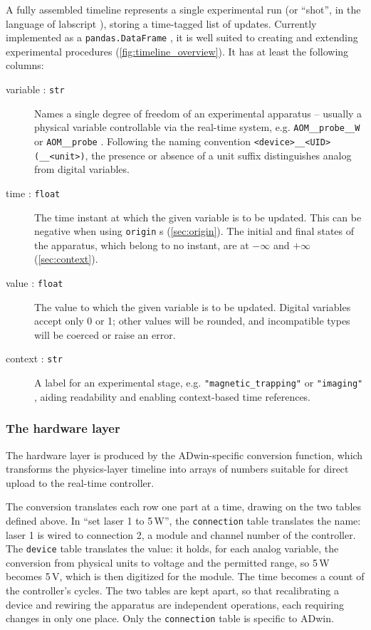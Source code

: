 \documentclass{SciPost}
\newcommand{\python}[1]{%
  \texttt{#1}%
}
\begin{document}
A fully assembled timeline represents a single experimental run (or “shot”, in the language of labscript \cite{starkey2013labscript}), storing a time-tagged list of updates. Currently implemented as a \python{pandas.DataFrame}, it is well suited to creating and extending experimental procedures (\cref{fig:timeline_overview}). It has at least the following columns:
\begin{description}
\item[variable : \python{str}] Names a single degree of freedom of an experimental apparatus – usually a physical variable controllable via the real-time system, e.g. \python{AOM__probe__W} or \python{AOM__probe}. Following the naming convention \texttt{<device>\_\_<UID>(\_\_<unit>)}, the presence or absence of a unit suffix distinguishes analog from digital variables.
\item[time : \python{float}] The time instant at which the given variable is to be updated. This can be negative when using \python{origin}s (\cref{sec:origin}). The initial and final states of the apparatus, which belong to no instant, are at $-\infty$ and $+\infty$ (\cref{sec:context}).
\item[value : \python{float}] The value to which the given variable is to be updated. Digital variables accept only 0 or 1; other values will be rounded, and incompatible types will be coerced or raise an error.
\item[context : \python{str}] A label for an experimental stage, e.g. \python{"magnetic_trapping"} or \python{"imaging"}, aiding readability and enabling context-based time references.
\end{description}
 
\subsubsection{The hardware layer}
\label{sec:hardwarelayer}
The hardware layer is produced by the ADwin-specific conversion function, which transforms the physics-layer timeline into arrays of numbers suitable for direct upload to the real-time controller.

The conversion translates each row one part at a time, drawing on the two tables defined above. In “set laser 1 to 5\,W”, the \python{connection} table translates the name: laser 1 is wired to connection 2, a module and channel number of the controller. The \python{device} table translates the value: it holds, for each analog variable, the conversion from physical units to voltage and the permitted range, so 5\,W becomes 5\,V, which is then digitized for the module. The time becomes a count of the controller’s cycles. The two tables are kept apart, so that recalibrating a device and rewiring the apparatus are independent operations, each requiring changes in only one place. Only the \python{connection} table is specific to ADwin.
\end{document}
